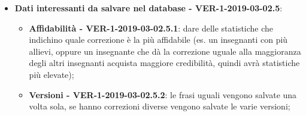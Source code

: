 \documentclass[a4paper, oneside, openany, dvipsnames, table]{article}
\begin{document}
\begin{itemize}
	\item \textbf{Dati interessanti da salvare nel database - VER-1-2019-03-02.5}:
	\begin{itemize}
		\item \textbf{Affidabilità - VER-1-2019-03-02.5.1}: dare delle statistiche che indichino quale correzione è la più affidabile
		(es. un insegnanti con più allievi, oppure un insegnante che dà la correzione uguale alla maggioranza degli 
		altri insegnanti acquista maggiore credibilità, quindi avrà statistiche più elevate); 
		\item \textbf{Versioni - VER-1-2019-03-02.5.2}: le frasi uguali vengono salvate una volta sola, se hanno correzioni diverse vengono salvate le varie versioni;
	\end{itemize}

\end{itemize}
\end{document}
